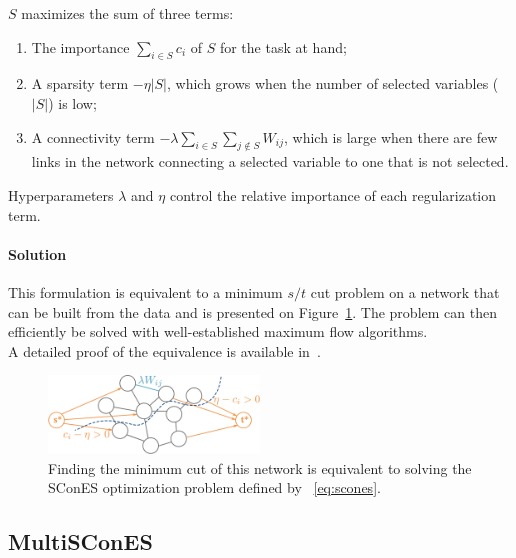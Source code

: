\documentclass[12pt,a4paper]{article}
\newcommand{\sset}{S}
\begin{document}
$\sset$ maximizes the sum of three terms:
\begin{enumerate}
\item The importance $\sum_{i \in \sset} c_i$ of $\sset$ for the task at hand;
\item A sparsity term $- \eta |\sset|$, which grows when the number of selected variables ($|\sset|$) is low;
\item A connectivity term $- \lambda \sum_{i \in \sset} \sum_{j \notin \sset} W_{ij} $, which is large when there are few links in the network connecting a selected variable to one that is not selected.
\end{enumerate}

Hyperparameters $\lambda$ and $\eta$ control the relative importance of each regularization term.

\paragraph{Solution}
This formulation is equivalent to a minimum $s/t$ cut problem on a network that can be built from the data and is presented on Figure~\ref{fig:mincut_scones}. The problem can then efficiently be solved with well-established maximum flow algorithms.\\

A detailed proof of the equivalence is available in~\cite{azencott13}. 

\begin{figure}[h]
  \centering
  \includegraphics[width=0.5\textwidth]{figures/mincut_scones}
  \caption{Finding the minimum cut of this network is equivalent to solving the SConES optimization problem defined by ~\ref{eq:scones}.}
  \label{fig:mincut_scones}
\end{figure}



\subsection{MultiSConES}
\end{document}

